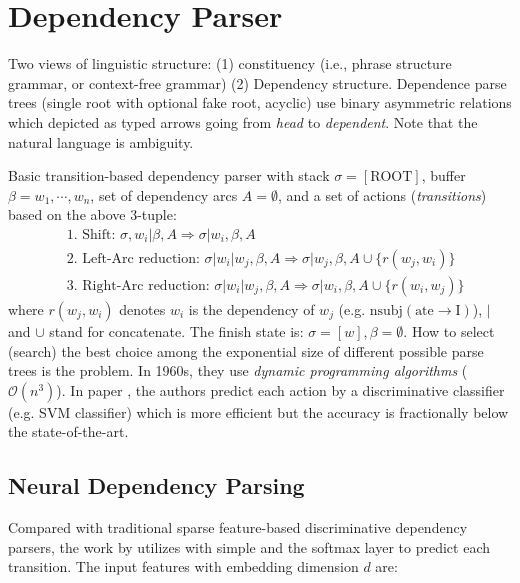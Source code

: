 \section{Dependency Parser}
Two views of linguistic structure: (1) constituency (i.e., phrase structure grammar, or context-free grammar) (2) Dependency structure.
Dependence parse trees (single root with optional fake root, acyclic) use binary asymmetric relations which depicted as typed arrows going from \emph{head} to \emph{dependent}.
Note that the natural language is ambiguity.

Basic transition-based dependency parser  with stack $\sigma = [\text{ROOT}]$, buffer $\beta = w_1, \cdots, w_n$, set of dependency arcs $A = \emptyset$, and a set of actions (\emph{transitions}) based on the above $3$-tuple:
\begin{align}
&\text{1. Shift: } \sigma , w_i | \beta, A \Rightarrow \sigma | w_i, \beta, A \nonumber \\
&\text{2. Left-Arc reduction: } \sigma | w_i | w_j, \beta, A \Rightarrow \sigma | w_j, \beta, A \cup \{r(w_j, w_i)\} \nonumber \\
&\text{3. Right-Arc reduction: } \sigma | w_i | w_j, \beta, A \Rightarrow \sigma | w_i, \beta, A \cup \{r(w_i, w_j)\} \nonumber
\end{align}
where $r(w_j, w_i)$ denotes $w_i$ is the dependency of $w_j$ (e.g. $\text{nsubj}(\text{ate} \rightarrow \text{I})$), $|$ and $\cup$ stand for concatenate.
The finish state is: $\sigma = [w], \beta = \emptyset$.
How to select (search) the best choice among the exponential size of different possible parse trees is the problem.
In 1960s, they use \emph{dynamic programming algorithms} ($\mathcal{O}(n^3)$).
In paper , the authors predict each action by a discriminative classifier (e.g. SVM classifier) which is more efficient but the accuracy is fractionally below the state-of-the-art.

\subsection{Neural Dependency Parsing}
Compared with traditional sparse feature-based discriminative dependency parsers, the work by  utilizes  with simple  and the softmax layer to predict each transition.
The input features with embedding dimension $d$ are:

